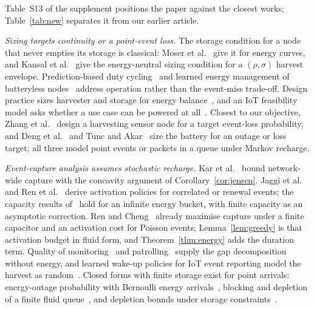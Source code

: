 Table~S13 of the supplement positions the paper against the closest works; Table~\ref{tab:new} separates it from our earlier article.

\emph{Sizing targets continuity or a point-event loss.} The storage condition for a node that never empties its storage is classical: Moser et al.~\cite{moser2007rts} give it for energy curves, and Kansal et al.~\cite{kansal2007} give the energy-neutral sizing condition for a $(\rho,\sigma)$ harvest envelope. Prediction-based duty cycling~\cite{buchli2014sensys} and learned energy management of batteryless nodes~\cite{ahn2023iotj} address operation rather than the event-miss trade-off. Design practice sizes harvester and storage for energy balance~\cite{kuaban2025iwcmc}, and an IoT feasibility model asks whether a use case can be powered at all~\cite{vanleemput2023iotj}. Closest to our objective, Zhang et al.~\cite{zhang2013twc} design a harvesting sensor node for a target event-loss probability, and Deng et al.~\cite{deng2022arxiv} and Tunc and Akar~\cite{tunc2017peva} size the battery for an outage or loss target; all three model point events or packets in a queue under Markov recharge.

\emph{Event-capture analysis assumes stochastic recharge.} Kar et al.~\cite{kar2006ton} bound network-wide capture with the concavity argument of Corollary~\ref{cor:jensen}. Jaggi et al.~\cite{jaggi2009wn} and Ren et al.~\cite{ren2014tpds,ren2015p2p} derive activation policies for correlated or renewal events; the capacity results of~\cite{jaggi2009wn} hold for an infinite energy bucket, with finite capacity as an asymptotic correction. Ren and Cheng~\cite{ren2015p2p} already maximise capture under a finite capacitor and an activation cost for Poisson events; Lemma~\ref{lem:greedy} is that activation budget in fluid form, and Theorem~\ref{thm:energy} adds the duration term. Quality of monitoring~\cite{yau2010tosn} and patrolling~\cite{lin2013opre} supply the gap decomposition without energy, and learned wake-up policies for IoT event reporting model the harvest as random~\cite{ruizguirola2026iotj}. Closed forms with finite storage exist for point arrivals: energy-outage probability with Bernoulli energy arrivals~\cite{ballestrin2026cl}, blocking and depletion of a finite fluid queue~\cite{deepak2026mcap}, and depletion bounds under storage constraints~\cite{yan2024iotj}.

